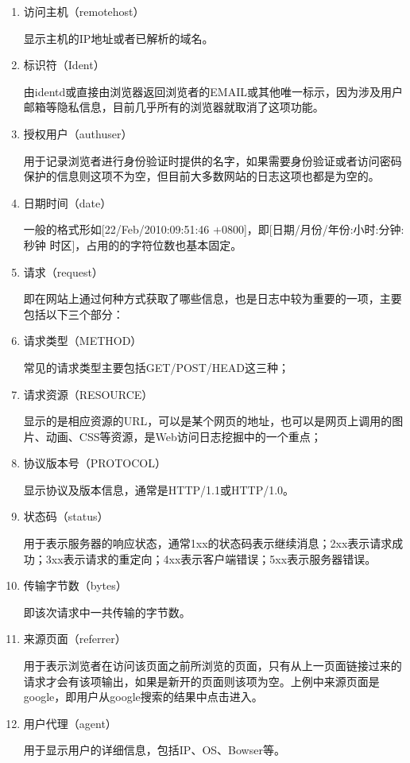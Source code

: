 \begin{enumerate}
\item 访问主机（remotehost）

显示主机的IP地址或者已解析的域名。

\item 标识符（Ident）

由identd或直接由浏览器返回浏览者的EMAIL或其他唯一标示，因为涉及用户邮箱等隐私信息，目前几乎所有的浏览器就取消了这项功能。

\item 授权用户（authuser）

用于记录浏览者进行身份验证时提供的名字，如果需要身份验证或者访问密码保护的信息则这项不为空，但目前大多数网站的日志这项也都是为空的。

\item 日期时间（date）

一般的格式形如[22/Feb/2010:09:51:46 +0800]，即[日期/月份/年份:小时:分钟:秒钟 时区]，占用的的字符位数也基本固定。

\item 请求（request）

即在网站上通过何种方式获取了哪些信息，也是日志中较为重要的一项，主要包括以下三个部分：


\item 请求类型（METHOD）

常见的请求类型主要包括GET/POST/HEAD这三种；


\item 请求资源（RESOURCE）


显示的是相应资源的URL，可以是某个网页的地址，也可以是网页上调用的图片、动画、CSS等资源，是Web访问日志挖掘中的一个重点；


\item 协议版本号（PROTOCOL）


显示协议及版本信息，通常是HTTP/1.1或HTTP/1.0。

\item 状态码（status）

用于表示服务器的响应状态，通常1xx的状态码表示继续消息；2xx表示请求成功；3xx表示请求的重定向；4xx表示客户端错误；5xx表示服务器错误。

\item 传输字节数（bytes）

即该次请求中一共传输的字节数。

\item 来源页面（referrer）

用于表示浏览者在访问该页面之前所浏览的页面，只有从上一页面链接过来的请求才会有该项输出，如果是新开的页面则该项为空。上例中来源页面是google，即用户从google搜索的结果中点击进入。

\item 用户代理（agent）

用于显示用户的详细信息，包括IP、OS、Bowser等。

\end{enumerate}


